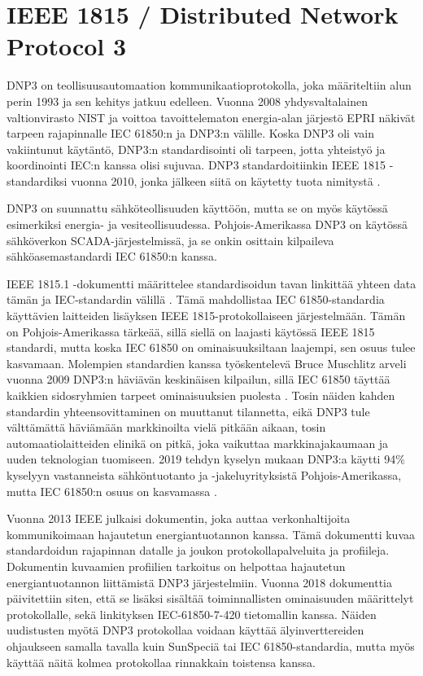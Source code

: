 \section{IEEE 1815 / Distributed Network Protocol 3}
  DNP3 on teollisuusautomaation kommunikaatioprotokolla, joka määriteltiin alun perin 1993 ja sen kehitys jatkuu edelleen. Vuonna 2008 yhdysvaltalainen valtionvirasto NIST ja voittoa tavoittelematon energia-alan järjestö \gls{EPRI} näkivät tarpeen rajapinnalle \gls{IEC} 61850:n ja DNP3:n välille. Koska DNP3 oli vain vakiintunut käytäntö, DNP3:n standardisointi oli tarpeen, jotta yhteistyö ja koordinointi \gls{IEC}:n kanssa olisi sujuvaa. DNP3 standardoitiinkin \gls{IEEE} 1815 -standardiksi vuonna 2010, jonka jälkeen siitä on käytetty tuota nimitystä \parencite{DNP3&61850}.

  DNP3 on suunnattu sähköteollisuuden käyttöön, mutta se on myös käytössä esimerkiksi energia- ja vesiteollisuudessa. Pohjois-Amerikassa DNP3 on käytössä sähköverkon \gls{SCADA}-järjestelmissä, ja se onkin osittain kilpaileva sähköasemastandardi IEC 61850:n kanssa.

  IEEE 1815.1 -dokumentti määrittelee standardisoidun tavan linkittää yhteen data tämän ja IEC-standardin välillä \parencite{IEEE1815.1}. Tämä mahdollistaa IEC 61850-standardia käyttävien laitteiden lisäyksen IEEE 1815-protokollaiseen järjestelmään. Tämän on Pohjois-Amerikassa tärkeää, sillä siellä on laajasti käytössä IEEE 1815 standardi, mutta koska IEC 61850 on ominaisuuksiltaan laajempi, sen osuus tulee kasvamaan. Molempien standardien kanssa työskentelevä Bruce Muschlitz arveli vuonna 2009 DNP3:n häviävän keskinäisen kilpailun, sillä IEC 61850 täyttää kaikkien sidosryhmien tarpeet ominaisuuksien puolesta \parencite{DNPvsIEC}. Tosin näiden kahden standardin yhteensovittaminen on muuttanut tilannetta, eikä DNP3 tule välttämättä häviämään markkinoilta vielä pitkään aikaan, tosin automaatiolaitteiden elinikä on pitkä, joka vaikuttaa markkinajakaumaan ja uuden teknologian tuomiseen. 2019 tehdyn kyselyn mukaan DNP3:a käytti 94\% kyselyyn vastanneista sähköntuotanto ja -jakeluyrityksistä Pohjois-Amerikassa, mutta IEC 61850:n osuus on kasvamassa \parencite{DNP3Study}.

  Vuonna 2013 IEEE julkaisi dokumentin, joka auttaa verkonhaltijoita kommunikoimaan hajautetun energiantuotannon kanssa. Tämä dokumentti kuvaa standardoidun rajapinnan datalle ja joukon protokollapalveluita ja profiileja. Dokumentin kuvaamien profiilien tarkoitus on helpottaa hajautetun energiantuotannon liittämistä DNP3 järjestelmiin. Vuonna 2018 dokumenttia päivitettiin siten, että se lisäksi sisältää toiminnallisten ominaisuuden määrittelyt protokollalle, sekä linkityksen IEC-61850-7-420 tietomallin kanssa. Näiden uudistusten myötä DNP3 protokollaa voidaan käyttää älyinverttereiden ohjaukseen samalla tavalla kuin SunSpeciä tai IEC 61850-standardia, mutta myös käyttää näitä kolmea protokollaa rinnakkain toistensa kanssa. \parencite{DNP3Inv, DNP3AppNote}

